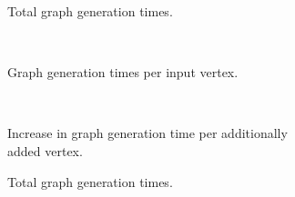 			\begin{figure}[h!]
				\begin{minipage}{.48\textwidth}
					\begin{subfigure}[t]{\linewidth}
						\begin{figcenter}
							
						\end{figcenter}
						\caption{Total graph generation times.}
						\label{fig:eval-import-city-abs}
					\end{subfigure}
					\\[3ex]
					\begin{subfigure}[t]{\linewidth}
						\begin{figcenter}
							
						\end{figcenter}
						\caption{Graph generation times per input vertex.}
					\end{subfigure}
					\\[3ex]
					\begin{subfigure}[t]{\linewidth}
						\begin{figcenter}
							
						\end{figcenter}
						\caption{Increase in graph generation time per additionally added vertex.}
						\label{fig:eval-import-city-rel-increase}
					\end{subfigure}
					\caption{Graph generation times using the \enquote{OSM city} dataset.}
					\label{fig:eval-import-city}
				\end{minipage}
				\hfill
				\begin{minipage}{.48\textwidth}
					\begin{subfigure}[t]{\linewidth}
						\begin{figcenter}
							
						\end{figcenter}
						\caption{Total graph generation times.}
						\label{fig:eval-import-rural-abs}
					\end{subfigure}
					\\[3ex]
					\begin{subfigure}[t]{\linewidth}
						\begin{figcenter}
							
						\end{figcenter}

\end{subfigure}
\end{minipage}
\end{figure}
